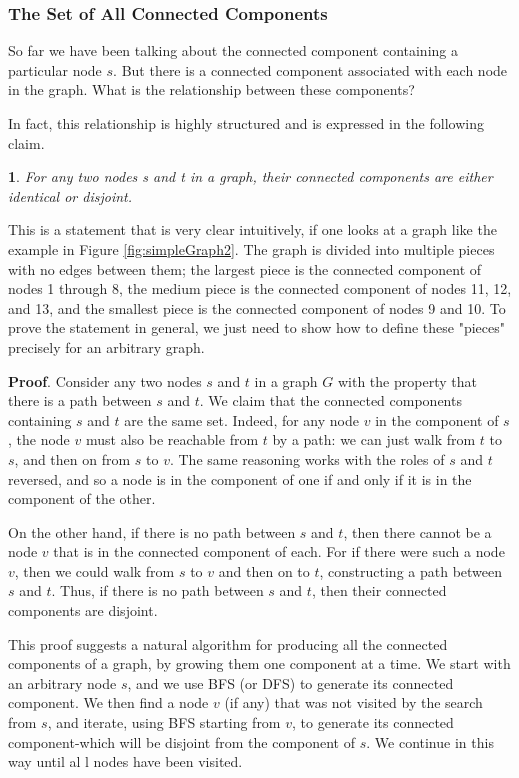 \documentclass[12pt,a4paper]{book}
\newtheorem{lemma}{}[chapter]
\begin{document}
\subsubsection{The Set of All Connected Components}
So far we have been talking about the connected component containing a particular node $s$. But there is a connected component associated with each node in the graph. What is the relationship between these components?\par
In fact, this relationship is highly structured and is expressed in the following claim.\par
\begin{lemma}
For any two nodes s and t in a graph, their connected components are either identical or disjoint.
\end{lemma}
This is a statement that is very clear intuitively, if one looks at a graph like the example in Figure \ref{fig:simpleGraph2}. The graph is divided into multiple pieces with no edges between them; the largest piece is the connected component of nodes 1 through 8, the medium piece is the connected component of nodes 11, 12, and 13, and the smallest piece is the connected component of nodes 9 and 10. To prove the statement in general, we just need to show how to define these "pieces" precisely for an arbitrary graph.\par
\textbf{Proof}. Consider any two nodes $s$ and $t$ in a graph $G$ with the property that there is a path between $s$ and $t$. We claim that the connected components containing $s$ and $t$ are the same set. Indeed, for any node $v$ in the component of $s$, the node $v$ must also be reachable from $t$ by a path: we can just walk from $t$ to $s$, and then on from $s$ to $v$. The same reasoning works with the roles of $s$ and $t$ reversed, and so a node is in the component of one if and only if it is in the component of the other.\par
On the other hand, if there is no path between $s$ and $t$, then there cannot be a node $v$ that is in the connected component of each. For if there were such a node $v$, then we could walk from $s$ to $v$ and then on to $t$, constructing a path between $s$ and $t$. Thus, if there is no path between $s$ and $t$, then their connected components are disjoint.\par
This proof suggests a natural algorithm for producing all the connected components of a graph, by growing them one component at a time. We start with an arbitrary node $s$, and we use BFS (or DFS) to generate its connected component. We then find a node $v$ (if any) that was not visited by the search from $s$, and iterate, using BFS starting from $v$, to generate its connected component-which will be disjoint from the component of $s$. We continue in this way until al	l nodes have been visited.
\end{document}
